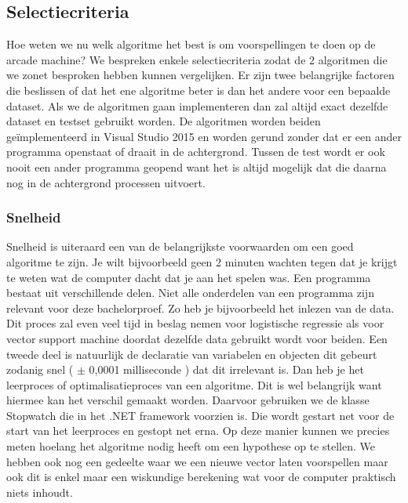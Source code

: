 \subsection{Selectiecriteria}
\label{sec:Selectiecriteria}
Hoe weten we nu welk algoritme het best is om voorspellingen te doen op de arcade machine? We bespreken enkele selectiecriteria zodat de 2 algoritmen die we zonet besproken hebben kunnen vergelijken. 
Er zijn twee belangrijke factoren die beslissen of dat het ene algoritme beter is dan het andere voor een bepaalde dataset. 
Als we de algoritmen gaan implementeren dan zal altijd exact dezelfde dataset en testset gebruikt worden. De algoritmen worden beiden geïmplementeerd in Visual Studio 2015 en worden gerund zonder dat er een ander programma openstaat of draait in de achtergrond. Tussen de test wordt er ook nooit een ander programma geopend want het is altijd mogelijk dat die daarna nog in de achtergrond processen uitvoert. 

\subsubsection{Snelheid}
Snelheid is uiteraard een van de belangrijkste voorwaarden om een goed algoritme te zijn. Je wilt bijvoorbeeld geen 2 minuten wachten tegen dat je krijgt te weten wat de computer dacht dat je aan het spelen was. Een programma bestaat uit verschillende delen. Niet alle onderdelen van een programma zijn relevant voor deze bachelorproef. Zo heb je bijvoorbeeld het inlezen van de data. Dit proces zal even veel tijd in beslag nemen voor logistische regressie als voor vector support machine doordat dezelfde data gebruikt wordt voor beiden. Een tweede deel is natuurlijk de declaratie van variabelen en objecten dit gebeurt zodanig snel ( $\pm$ 0,0001 milliseconde ) dat dit irrelevant is.\newline
Dan heb je het leerproces of optimalisatieproces van een algoritme. Dit is wel belangrijk want hiermee kan het verschil gemaakt worden. Daarvoor gebruiken we de klasse Stopwatch die in het .NET framework voorzien is. Die wordt gestart net voor de start van het leerproces en gestopt net erna. Op deze manier kunnen we precies meten hoelang het algoritme nodig heeft om een hypothese op te stellen. \newline
We hebben ook nog een gedeelte waar we een nieuwe vector laten voorspellen maar ook dit is enkel maar een wiskundige berekening wat voor de computer praktisch niets inhoudt. 


